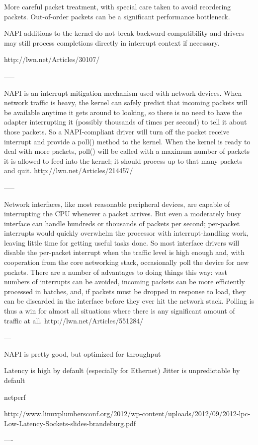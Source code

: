 More careful packet treatment, with special care taken to avoid reordering packets. Out-of-order packets can be a significant performance bottleneck. 


NAPI additions to the kernel do not break backward compatibility and drivers may still process completions directly in interrupt context if necessary.

http://lwn.net/Articles/30107/

-----


NAPI is an interrupt mitigation mechanism used with network devices. When network traffic is heavy, the kernel can safely predict that incoming packets will be available anytime it gets around to looking, so there is no need to have the adapter interrupting it (possibly thousands of times per second) to tell it about those packets. So a NAPI-compliant driver will turn off the packet receive interrupt and provide a poll() method to the kernel. When the kernel is ready to deal with more packets, poll() will be called with a maximum number of packets it is allowed to feed into the kernel; it should process up to that many packets and quit.
http://lwn.net/Articles/214457/

-----

Network interfaces, like most reasonable peripheral devices, are capable of interrupting the CPU whenever a packet arrives. But even a moderately busy interface can handle hundreds or thousands of packets per second; per-packet interrupts would quickly overwhelm the processor with interrupt-handling work, leaving little time for getting useful tasks done. So most interface drivers will disable the per-packet interrupt when the traffic level is high enough and, with cooperation from the core networking stack, occasionally poll the device for new packets. There are a number of advantages to doing things this way: vast numbers of interrupts can be avoided, incoming packets can be more efficiently processed in batches, and, if packets must be dropped in response to load, they can be discarded in the interface before they ever hit the network stack. Polling is thus a win for almost all situations where there is any significant amount of traffic at all. 
http://lwn.net/Articles/551284/

---

NAPI is pretty good, but optimized for throughput

Latency is high by default (especially for Ethernet)
Jitter is unpredictable by default

netperf

http://www.linuxplumbersconf.org/2012/wp-content/uploads/2012/09/2012-lpc-Low-Latency-Sockets-slides-brandeburg.pdf

----
